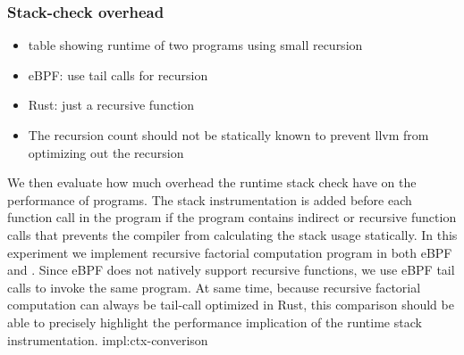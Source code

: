 \subsubsection{Stack-check overhead}
\begin{itemize}
    \item table showing runtime of two programs using small recursion
    \item eBPF: use tail calls for recursion
    \item Rust: just a recursive function
    \item The recursion count should not be statically known to prevent llvm
        from optimizing out the recursion
\end{itemize}

We then evaluate how much overhead the runtime stack check have on the
    performance of \projname{} programs.
The stack instrumentation is added before each
    function call in the \projname{} program if the program contains indirect
    or recursive function calls that prevents the compiler from calculating the
    stack usage statically.
In this experiment we implement recursive factorial computation program in both
    eBPF and \projname{}.
Since eBPF does not natively support recursive functions, we use eBPF tail
    calls to invoke the same program.
At same time, because recursive factorial computation can always be tail-call
    optimized in Rust, this comparison should be able to precisely highlight
    the performance implication of the runtime stack instrumentation.
impl:ctx-converison


